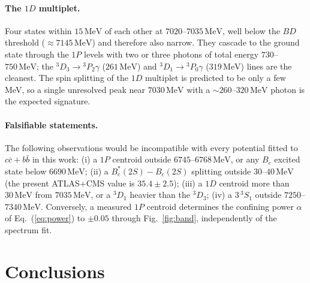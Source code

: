 \documentclass[10pt,twocolumn]{article}
\newcommand{\Bc}{B_c}
\newcommand{\Bcs}{B_c^*}
\newcommand{\cc}{c\bar c}
\newcommand{\bb}{b\bar b}
\newcommand{\MeV}{\,\mathrm{MeV}}
\begin{document}
\paragraph{The $1D$ multiplet.}
Four states within $15\MeV$ of each other at $7020$--$7035\MeV$, well below the $BD$ threshold ($\approx7145\MeV$) and therefore also narrow.
They cascade to the ground state through the $1P$ levels with two or three photons of total energy $730$--$750\MeV$; the $^3D_3\to{}^3P_2\gamma$ ($261\MeV$) and $^3D_1\to{}^3P_0\gamma$ ($319\MeV$) lines are the cleanest.
The spin splitting of the $1D$ multiplet is predicted to be only a few MeV, so a single unresolved peak near $7030\MeV$ with a $\sim260$--$320\MeV$ photon is the expected signature.

\paragraph{Falsifiable statements.}
The following observations would be incompatible with every potential fitted to $\cc+\bb$ in this work:
(i) a $1P$ centroid outside $6745$--$6768\MeV$, or any $\Bc$ excited state below $6690\MeV$;
(ii) a $\Bcs(2S)-\Bc(2S)$ splitting outside $30$--$40\MeV$ (the present ATLAS$+$CMS value is $35.4\pm2.5$);
(iii) a $1D$ centroid more than $30\MeV$ from $7035\MeV$, or a $^3D_1$ heavier than the $^3D_3$;
(iv) a $3\,^3S_1$ outside $7250$--$7340\MeV$.
Conversely, a measured $1P$ centroid determines the confining power $\alpha$ of Eq.~(\ref{eq:power}) to $\pm0.05$ through Fig.~\ref{fig:band}, independently of the spectrum fit.

\section{Conclusions}
\label{sec:conclusions}
\end{document}
